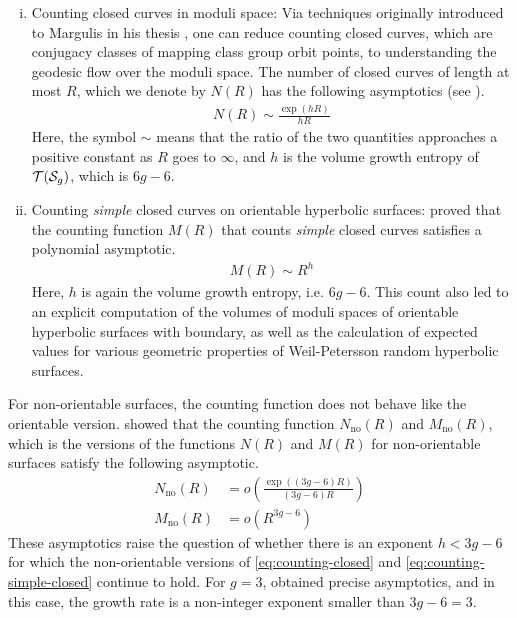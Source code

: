 \begin{enumerate}[(i)]
\item Counting closed curves in moduli space: Via techniques originally introduced to Margulis in his thesis \cite{margulis2004some}, one can reduce counting closed curves, which are conjugacy classes of mapping class group orbit points, to understanding the geodesic flow over the moduli space.
  The number of closed curves of length at most $R$, which we denote by $N(R)$ has the following asymptotics (see \cite{eskinmirzakhani}).
  \begin{align}
    \label{eq:counting-closed}
    N(R) \sim \frac{\exp(hR)}{hR}
  \end{align}
  Here, the symbol $\sim$ means that the ratio of the two quantities approaches a positive constant as $R$ goes to $\infty$, and $h$ is the volume growth entropy of $\mathcal{T}(\mathcal{S}_{g})$, which is $6g-6$.
\item Counting \emph{simple} closed curves on orientable hyperbolic surfaces: \textcite{mirzakhani2008growth} proved that the counting function $M(R)$ that counts \emph{simple} closed curves satisfies a polynomial asymptotic.
  \begin{align}
    \label{eq:counting-simple-closed}
    M(R) \sim R^{h}
  \end{align}
  Here, $h$ is again the volume growth entropy, i.e. $6g-6$.
  This count also led to an explicit computation of the volumes of moduli spaces of orientable hyperbolic surfaces with boundary, as well as the calculation of expected values for various geometric properties of Weil-Petersson random hyperbolic surfaces.
\end{enumerate}

For non-orientable surfaces, the counting function does not behave like the orientable version.
\textcite{gendulphe2017whats} showed that the counting function $N_{\mathrm{no}}(R)$ and $M_{\mathrm{no}}(R)$, which is the versions of the functions $N(R)$ and $M(R)$ for non-orientable surfaces satisfy the following asymptotic.
\begin{align*}
  N_{\mathrm{no}}(R) &= o\left( \frac{\exp((3g-6)R)}{(3g-6)R} \right) \\
  M_{\mathrm{no}}(R) &= o(R^{3g-6})
\end{align*}
These asymptotics raise the question of whether there is an exponent $h < 3g-6$ for which the non-orientable versions of \eqref{eq:counting-closed} and \eqref{eq:counting-simple-closed} continue to hold.
For $g = 3$, \textcite{10.1093/imrn/rny112} obtained precise asymptotics, and in this case, the growth rate is a non-integer exponent smaller than $3g - 6 = 3$.

